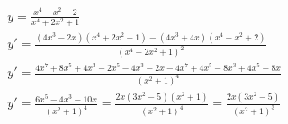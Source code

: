 \begin{ex}
\begin{align}
&y=\frac{x^4-x^2+2}{x^4+2x^2+1}\nonumber\\
&y'=\frac{(4x^3-2x)(x^4+2x^2+1)-(4x^3+4x)(x^4-x^2+2)}{(x^4+2x^2+1)^2}\nonumber\\
&y'=\frac{4x^7+8x^5+4x^3-2x^5-4x^3-2x-4x^7+4x^5-8x^3+4x^5-8x}{(x^2+1)^4}\nonumber\\
&y'=\frac{6x^5-4x^3-10x}{(x^2+1)^4}=\frac{2x(3x^2-5)(x^2+1)}{(x^2+1)^4}=\frac{2x(3x^2-5)}{(x^2+1)^3}\nonumber
\end{align}
\end{ex}